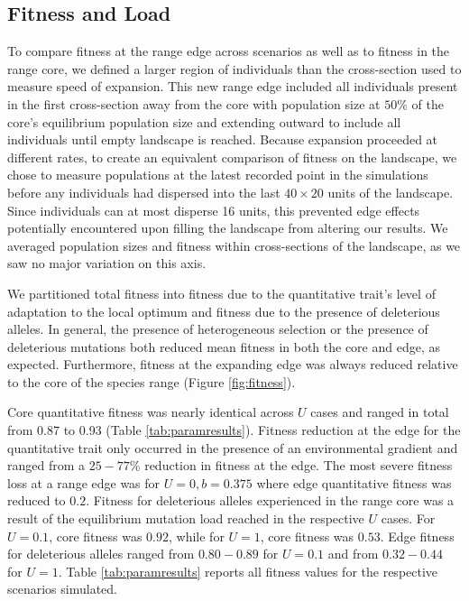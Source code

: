 \subsection{Fitness and Load}

To compare fitness at the range edge across scenarios as well as to fitness in the range core, we defined a larger region of individuals than the cross-section used to measure speed of expansion. This new range edge included all individuals present in the first cross-section away from the core with population size at $50\%$ of the core's equilibrium population size and extending outward to include all individuals until empty landscape is reached. Because expansion proceeded at different rates, to create an equivalent comparison of fitness on the landscape, we chose to measure populations at the latest recorded point in the simulations before any individuals had dispersed into the last $40\times20$ units of the landscape. %
Since individuals can at most disperse 16 units, this prevented edge effects potentially encountered upon filling the landscape from altering our results. We averaged population sizes and fitness within cross-sections of the landscape, as we saw no major variation on this axis.

We partitioned total fitness into fitness due to the quantitative trait's level of adaptation to the local optimum and fitness due to the presence of deleterious alleles. In general, the presence of heterogeneous selection or the presence of deleterious mutations both reduced mean fitness in both the core and edge, as expected. Furthermore, fitness at the expanding edge was always reduced relative to the core of the species range (Figure \ref{fig:fitness}). 

Core quantitative fitness was nearly identical across $U$ cases and ranged in total from 0.87 to 0.93 (Table \ref{tab:paramresults}). Fitness reduction at the edge for the quantitative trait only occurred in the presence of an environmental gradient and ranged from a $25-77$\% reduction in fitness at the edge. The most severe fitness loss at a range edge was for $U = 0, b = 0.375$ where edge quantitative fitness was reduced to $0.2$. %
Fitness for deleterious alleles experienced in the range core was a result of the equilibrium mutation load reached in the respective $U$ cases. For $U = 0.1$, core fitness was $0.92$, while for $U = 1$, core fitness was $0.53$. Edge fitness for deleterious alleles ranged from $0.80-0.89$ for $U = 0.1$ and from $0.32-0.44$ for $U = 1$. Table \ref{tab:paramresults} reports all fitness values for the respective scenarios simulated.


